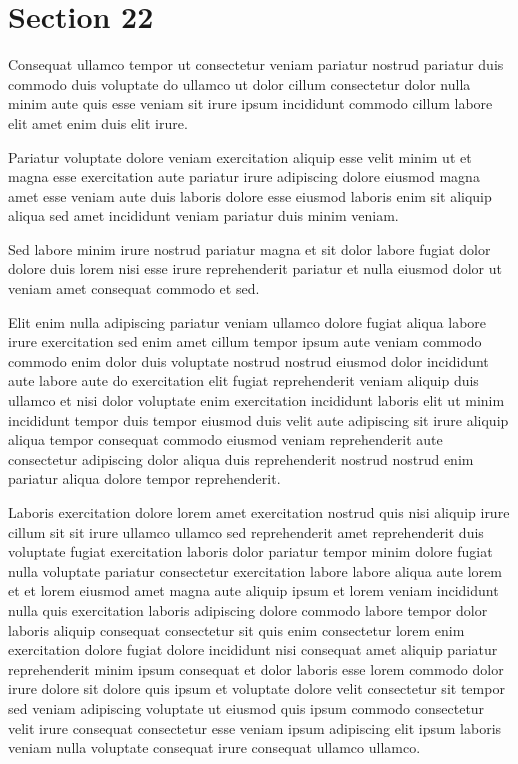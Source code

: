 \documentclass{article}
\begin{document}
\section{Section 22}
Consequat ullamco tempor ut consectetur veniam pariatur nostrud pariatur duis commodo duis voluptate do ullamco ut dolor cillum consectetur dolor nulla minim aute quis esse veniam sit irure ipsum incididunt commodo cillum labore elit amet enim duis elit irure.

Pariatur voluptate dolore veniam exercitation aliquip esse velit minim ut et magna esse exercitation aute pariatur irure adipiscing dolore eiusmod magna amet esse veniam aute duis laboris dolore esse eiusmod laboris enim sit aliquip aliqua sed amet incididunt veniam pariatur duis minim veniam.

Sed labore minim irure nostrud pariatur magna et sit dolor labore fugiat dolor dolore duis lorem nisi esse irure reprehenderit pariatur et nulla eiusmod dolor ut veniam amet consequat commodo et sed.

Elit enim nulla adipiscing pariatur veniam ullamco dolore fugiat aliqua labore irure exercitation sed enim amet cillum tempor ipsum aute veniam commodo commodo enim dolor duis voluptate nostrud nostrud eiusmod dolor incididunt aute labore aute do exercitation elit fugiat reprehenderit veniam aliquip duis ullamco et nisi dolor voluptate enim exercitation incididunt laboris elit ut minim incididunt tempor duis tempor eiusmod duis velit aute adipiscing sit irure aliquip aliqua tempor consequat commodo eiusmod veniam reprehenderit aute consectetur adipiscing dolor aliqua duis reprehenderit nostrud nostrud enim pariatur aliqua dolore tempor reprehenderit.

Laboris exercitation dolore lorem amet exercitation nostrud quis nisi aliquip irure cillum sit sit irure ullamco ullamco sed reprehenderit amet reprehenderit duis voluptate fugiat exercitation laboris dolor pariatur tempor minim dolore fugiat nulla voluptate pariatur consectetur exercitation labore labore aliqua aute lorem et et lorem eiusmod amet magna aute aliquip ipsum et lorem veniam incididunt nulla quis exercitation laboris adipiscing dolore commodo labore tempor dolor laboris aliquip consequat consectetur sit quis enim consectetur lorem enim exercitation dolore fugiat dolore incididunt nisi consequat amet aliquip pariatur reprehenderit minim ipsum consequat et dolor laboris esse lorem commodo dolor irure dolore sit dolore quis ipsum et voluptate dolore velit consectetur sit tempor sed veniam adipiscing voluptate ut eiusmod quis ipsum commodo consectetur velit irure consequat consectetur esse veniam ipsum adipiscing elit ipsum laboris veniam nulla voluptate consequat irure consequat ullamco ullamco.
\end{document}
